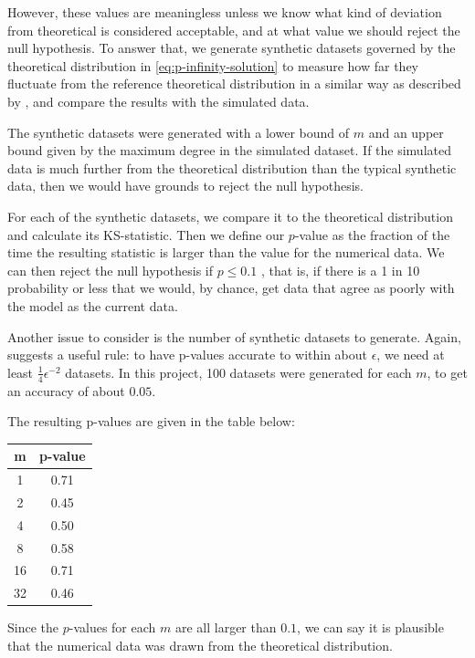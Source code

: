 However, these values are meaningless unless we know what kind of deviation from theoretical is considered acceptable, and at what value we should reject the null hypothesis. To answer that, we generate synthetic datasets governed by the theoretical distribution in \autoref{eq:p-infinity-solution} to measure how far they fluctuate from the reference theoretical distribution in a similar way as described by \citet{Clauset2009}, and compare the results with the simulated data. 

The synthetic datasets were generated with a lower bound of $m$ and an upper bound given by the maximum degree in the simulated dataset. If the simulated data is much further from the theoretical distribution than the typical synthetic data, then we would have grounds to reject the null hypothesis. 

For each of the synthetic datasets, we compare it to the theoretical distribution and calculate its KS-statistic. Then we define our $p$-value as the fraction of the time the resulting statistic is larger than the value for the numerical data. We can then reject the null hypothesis if $p \leq 0.1$ \citep{Clauset2009}, that is, if there is a 1 in 10 probability or less that we would, by chance, get data that agree as poorly with the model as the current data. 

Another issue to consider is the number of synthetic datasets to generate. Again, \citet{Clauset2009} suggests a useful rule: to have p-values accurate to within about $\epsilon$, we need at least $\frac{1}{4}\epsilon^{-2}$ datasets. In this project, 100 datasets were generated for each $m$, to get an accuracy of about $0.05$. 

The resulting p-values are given in the table below:
\begin{center}
\begin{tabular}{ c | c }
 m &  p-value\\ 
 \hline
 1 & 0.71 \\  
 2 & 0.45 \\
 4 & 0.50 \\
 8 & 0.58 \\
 16 & 0.71 \\
 32 & 0.46 \\  
\end{tabular}
\label{table:ks-test-all}
\end{center}

Since the $p$-values for each $m$ are all larger than $0.1$, we can say it is plausible that the numerical data was drawn from the theoretical distribution. 

